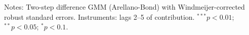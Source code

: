 \begin{minipage}{\textwidth}\scriptsize Notes: Two-step difference GMM (Arellano-Bond) with Windmeijer-corrected robust standard errors. Instruments: lags 2--5 of contribution. $^{***}p<0.01$; $^{**}p<0.05$; $^{*}p<0.1$.\end{minipage}
